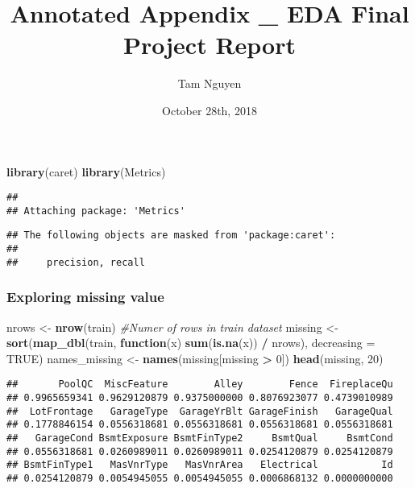 \documentclass[]{article}
\title{Annotated Appendix \_ EDA Final Project Report}
\author{Tam Nguyen}
\date{October 28th, 2018}
\newenvironment{Shaded}{\begin{snugshade}}{\end{snugshade}}
\newcommand{\CommentTok}[1]{\textcolor[rgb]{0.56,0.35,0.01}{\textit{#1}}}
\newcommand{\ControlFlowTok}[1]{\textcolor[rgb]{0.13,0.29,0.53}{\textbf{#1}}}
\newcommand{\DataTypeTok}[1]{\textcolor[rgb]{0.13,0.29,0.53}{#1}}
\newcommand{\DecValTok}[1]{\textcolor[rgb]{0.00,0.00,0.81}{#1}}
\newcommand{\KeywordTok}[1]{\textcolor[rgb]{0.13,0.29,0.53}{\textbf{#1}}}
\newcommand{\NormalTok}[1]{#1}
\newcommand{\OperatorTok}[1]{\textcolor[rgb]{0.81,0.36,0.00}{\textbf{#1}}}
\newcommand{\OtherTok}[1]{\textcolor[rgb]{0.56,0.35,0.01}{#1}}
\newcommand{\StringTok}[1]{\textcolor[rgb]{0.31,0.60,0.02}{#1}}
\begin{document}
\maketitle

\begin{Shaded}
\begin{Highlighting}[]
\KeywordTok{library}\NormalTok{(caret)}
\KeywordTok{library}\NormalTok{(Metrics)}
\end{Highlighting}
\end{Shaded}

\begin{verbatim}
## 
## Attaching package: 'Metrics'
\end{verbatim}

\begin{verbatim}
## The following objects are masked from 'package:caret':
## 
##     precision, recall
\end{verbatim}

\hypertarget{exploring-missing-value}{%
\subsubsection{Exploring missing value}\label{exploring-missing-value}}

\begin{Shaded}
\begin{Highlighting}[]
\NormalTok{nrows <-}\StringTok{ }\KeywordTok{nrow}\NormalTok{(train) }\CommentTok{#Numer of rows in train dataset}
\NormalTok{missing <-}\StringTok{ }\KeywordTok{sort}\NormalTok{(}\KeywordTok{map_dbl}\NormalTok{(train, }\ControlFlowTok{function}\NormalTok{(x) }\KeywordTok{sum}\NormalTok{(}\KeywordTok{is.na}\NormalTok{(x)) }\OperatorTok{/}\StringTok{ }\NormalTok{nrows), }\DataTypeTok{decreasing =} \OtherTok{TRUE}\NormalTok{)}
\NormalTok{names_missing <-}\StringTok{ }\KeywordTok{names}\NormalTok{(missing[missing }\OperatorTok{>}\StringTok{ }\DecValTok{0}\NormalTok{])}
\KeywordTok{head}\NormalTok{(missing, }\DecValTok{20}\NormalTok{)}
\end{Highlighting}
\end{Shaded}

\begin{verbatim}
##       PoolQC  MiscFeature        Alley        Fence  FireplaceQu 
## 0.9965659341 0.9629120879 0.9375000000 0.8076923077 0.4739010989 
##  LotFrontage   GarageType  GarageYrBlt GarageFinish   GarageQual 
## 0.1778846154 0.0556318681 0.0556318681 0.0556318681 0.0556318681 
##   GarageCond BsmtExposure BsmtFinType2     BsmtQual     BsmtCond 
## 0.0556318681 0.0260989011 0.0260989011 0.0254120879 0.0254120879 
## BsmtFinType1   MasVnrType   MasVnrArea   Electrical           Id 
## 0.0254120879 0.0054945055 0.0054945055 0.0006868132 0.0000000000
\end{verbatim}
\end{document}

